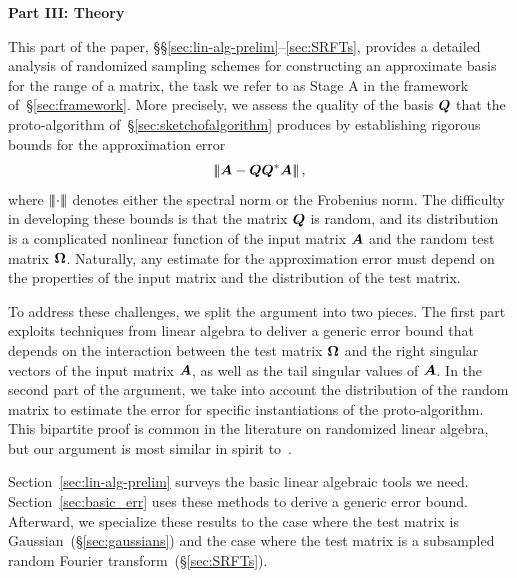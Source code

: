 \documentclass[final]{siamltex}
\newcounter{algorithm}[section]
\begin{document}

\vspace{5mm}

\begin{center}
{\bf Part III: Theory}
\end{center}

\lsp

This part of the paper, \S\S\ref{sec:lin-alg-prelim}--\ref{sec:SRFTs},
provides a detailed analysis of randomized sampling schemes
for constructing an approximate basis for the range of a matrix,
the task we refer to as Stage A in the framework of~\S\ref{sec:framework}.
More precisely, we assess the quality of the basis $\bm{Q}$
that the proto-algorithm of~\S\ref{sec:sketchofalgorithm} produces
by establishing rigorous bounds for the approximation error
\begin{equation}
\label{eq:basicerror}
\triplenorm{ \mtx{A} - \mtx{QQ}^\adj \mtx{A} },
\end{equation}
where $\left\vert\!\left\vert\!\left\vert {\cdot} \right\vert\!\right\vert\!\right\vert$ denotes either the spectral norm or the
Frobenius norm. The difficulty in developing these bounds is that
the matrix $\bm{Q}$ is random, and its distribution is a
complicated nonlinear function of the input matrix $\bm{A}$ and
the random test matrix $\bm{\Omega}$.  Naturally, any estimate for
the approximation error must depend on the properties of the input
matrix and the distribution of the test matrix.

To address these challenges, we split the argument into two
pieces.  The first part exploits techniques from linear algebra
to deliver a generic error bound that depends
on the interaction between the test matrix $\bm{\Omega}$
and the right singular vectors of the input matrix $\bm{A}$,
as well as the tail singular values of $\bm{A}$.
In the second part of the argument, we take into
account the distribution of the random matrix to estimate the
error for specific instantiations of the proto-algorithm.
This bipartite proof is common in the literature on randomized
linear algebra, but our argument is most similar in spirit
to~\cite{BMD09:Improved-Approximation}.

Section~\ref{sec:lin-alg-prelim} surveys the basic linear algebraic tools
we need.
Section~\ref{sec:basic_err} uses these methods to derive a generic error
bound.  Afterward, we specialize these results to the case where the test matrix is
Gaussian~(\S\ref{sec:gaussians}) and the case where the test matrix is
a subsampled random Fourier transform~(\S\ref{sec:SRFTs}).
\end{document}
